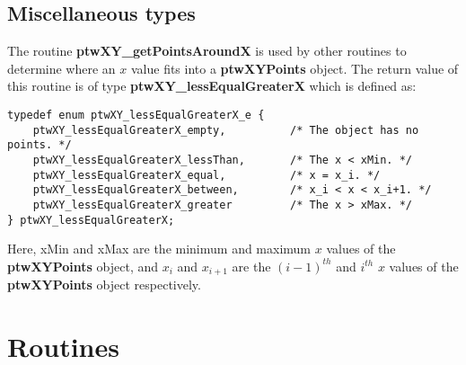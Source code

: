 \documentclass[11pt]{article}
\newcommand{\highlight}[1]{{\bf #1}}
\begin{document}
\subsection{Miscellaneous types}
The routine \highlight{ptwXY\_getPointsAroundX} is used by other routines to determine
where an $x$ value fits into a \highlight{ptwXYPoints} object. The return value of this
routine is of type \highlight{ptwXY\_less\-Equal\-GreaterX} which is defined as:
\begin{verbatim}
typedef enum ptwXY_lessEqualGreaterX_e {
    ptwXY_lessEqualGreaterX_empty,          /* The object has no points. */
    ptwXY_lessEqualGreaterX_lessThan,       /* The x < xMin. */
    ptwXY_lessEqualGreaterX_equal,          /* x = x_i. */
    ptwXY_lessEqualGreaterX_between,        /* x_i < x < x_i+1. */
    ptwXY_lessEqualGreaterX_greater         /* The x > xMax. */
} ptwXY_lessEqualGreaterX;
\end{verbatim}
Here, xMin and xMax are the minimum and maximum $x$ values of the \highlight{ptwXYPoints} object, and
$x_i$ and $x_{i+1}$ are the $(i-1)^{th}$ and $i^{th}$ $x$ values of the \highlight{ptwXYPoints} object respectively.

\section{Routines}











\end{document}

